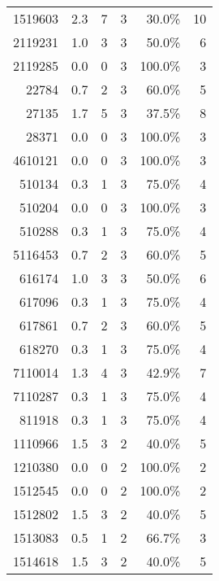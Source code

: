 \begin{longtable}{lrrrrr}
	\multicolumn{1}{r}{1519603} & 2.3   & 7     & 3     & 30.0\% & 10 \\
	\multicolumn{1}{r}{2119231} & 1.0   & 3     & 3     & 50.0\% & 6 \\
	\multicolumn{1}{r}{2119285} & 0.0   & 0     & 3     & 100.0\% & 3 \\
	\multicolumn{1}{r}{22784} & 0.7   & 2     & 3     & 60.0\% & 5 \\
	\multicolumn{1}{r}{27135} & 1.7   & 5     & 3     & 37.5\% & 8 \\
	\multicolumn{1}{r}{28371} & 0.0   & 0     & 3     & 100.0\% & 3 \\
	\multicolumn{1}{r}{4610121} & 0.0   & 0     & 3     & 100.0\% & 3 \\
	\multicolumn{1}{r}{510134} & 0.3   & 1     & 3     & 75.0\% & 4 \\
	\multicolumn{1}{r}{510204} & 0.0   & 0     & 3     & 100.0\% & 3 \\
	\multicolumn{1}{r}{510288} & 0.3   & 1     & 3     & 75.0\% & 4 \\
	\multicolumn{1}{r}{5116453} & 0.7   & 2     & 3     & 60.0\% & 5 \\
	\multicolumn{1}{r}{616174} & 1.0   & 3     & 3     & 50.0\% & 6 \\
	\multicolumn{1}{r}{617096} & 0.3   & 1     & 3     & 75.0\% & 4 \\
	\multicolumn{1}{r}{617861} & 0.7   & 2     & 3     & 60.0\% & 5 \\
	\multicolumn{1}{r}{618270} & 0.3   & 1     & 3     & 75.0\% & 4 \\
	\multicolumn{1}{r}{7110014} & 1.3   & 4     & 3     & 42.9\% & 7 \\
	\multicolumn{1}{r}{7110287} & 0.3   & 1     & 3     & 75.0\% & 4 \\
	\multicolumn{1}{r}{811918} & 0.3   & 1     & 3     & 75.0\% & 4 \\
	\multicolumn{1}{r}{1110966} & 1.5   & 3     & 2     & 40.0\% & 5 \\
	\multicolumn{1}{r}{1210380} & 0.0   & 0     & 2     & 100.0\% & 2 \\
	\multicolumn{1}{r}{1512545} & 0.0   & 0     & 2     & 100.0\% & 2 \\
	\multicolumn{1}{r}{1512802} & 1.5   & 3     & 2     & 40.0\% & 5 \\
	\multicolumn{1}{r}{1513083} & 0.5   & 1     & 2     & 66.7\% & 3 \\
	\multicolumn{1}{r}{1514618} & 1.5   & 3     & 2     & 40.0\% & 5 \\

\end{longtable}
